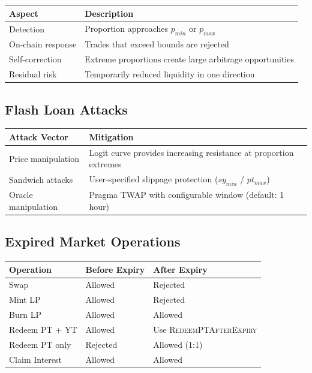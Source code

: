 \begin{center}
\begin{tabularx}{\textwidth}{l >{\raggedright\arraybackslash}X}
\toprule
\textbf{Aspect} & \textbf{Description} \\
\midrule
Detection & Proportion approaches $p_{min}$ or $p_{max}$ \\
On-chain response & Trades that exceed bounds are rejected \\
Self-correction & Extreme proportions create large arbitrage opportunities \\
Residual risk & Temporarily reduced liquidity in one direction \\
\bottomrule
\end{tabularx}
\end{center}

\subsection{Flash Loan Attacks}

\begin{center}
\begin{tabularx}{\textwidth}{l >{\raggedright\arraybackslash}X}
\toprule
\textbf{Attack Vector} & \textbf{Mitigation} \\
\midrule
Price manipulation & Logit curve provides increasing resistance at proportion extremes \\
Sandwich attacks & User-specified slippage protection ($sy_{min}$ / $pt_{max}$) \\
Oracle manipulation & Pragma TWAP with configurable window (default: 1 hour) \\
\bottomrule
\end{tabularx}
\end{center}

\subsection{Expired Market Operations}

\begin{center}
\begin{tabular}{lll}
\toprule
\textbf{Operation} & \textbf{Before Expiry} & \textbf{After Expiry} \\
\midrule
Swap & Allowed & Rejected \\
Mint LP & Allowed & Rejected \\
Burn LP & Allowed & Allowed \\
Redeem PT + YT & Allowed & Use \textsc{RedeemPTAfterExpiry} \\
Redeem PT only & Rejected & Allowed (1:1) \\
Claim Interest & Allowed & Allowed \\
\bottomrule
\end{tabular}
\end{center}
